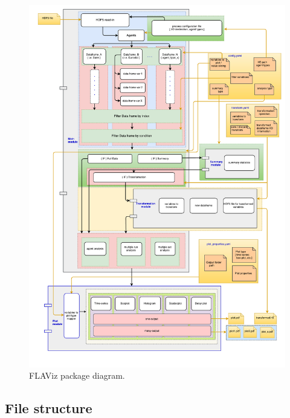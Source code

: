 \documentclass[10pt,a4paper]{article}
\begin{document}
\begin{figure}[Htp!]
\centering\leavevmode
\graphicspath{{./png/}}
%
\begin{boxedminipage}{16cm}
\centering\leavevmode
\includegraphics[scale=.4]{flavis_package_diagram.pdf} 
\end{boxedminipage}
\label{Fig: Package diagram}
\caption{\footnotesize FLAViz package diagram.}
\end{figure}



\subsection{File structure}
\end{document}
